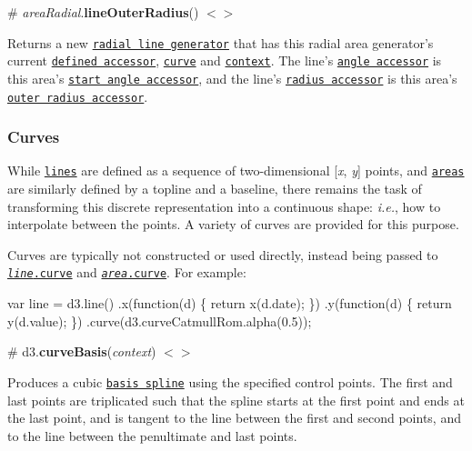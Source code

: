 \label{_areaRadial_lineOuterRadius}%
\# {\itshape area\+Radial}.{\bfseries line\+Outer\+Radius}() \href{https://github.com/d3/d3-shape/blob/master/src/areaRadial.js#L22}{\tt $<$$>$}

Returns a new \href{#lineRadial}{\tt radial line generator} that has this radial area generator’s current \href{#areaRadial_defined}{\tt defined accessor}, \href{#areaRadial_curve}{\tt curve} and \href{#areaRadial_context}{\tt context}. The line’s \href{#lineRadial_angle}{\tt angle accessor} is this area’s \href{#areaRadial_startAngle}{\tt start angle accessor}, and the line’s \href{#lineRadial_radius}{\tt radius accessor} is this area’s \href{#areaRadial_outerRadius}{\tt outer radius accessor}.

\subsubsection*{Curves}

While \href{#lines}{\tt lines} are defined as a sequence of two-\/dimensional \mbox{[}{\itshape x}, {\itshape y}\mbox{]} points, and \href{#areas}{\tt areas} are similarly defined by a topline and a baseline, there remains the task of transforming this discrete representation into a continuous shape\+: {\itshape i.\+e.}, how to interpolate between the points. A variety of curves are provided for this purpose.

Curves are typically not constructed or used directly, instead being passed to \href{#line_curve}{\tt {\itshape line}.curve} and \href{#area_curve}{\tt {\itshape area}.curve}. For example\+:


\begin{DoxyCode}
var line = d3.line()
    .x(function(d) \{ return x(d.date); \})
    .y(function(d) \{ return y(d.value); \})
    .curve(d3.curveCatmullRom.alpha(0.5));
\end{DoxyCode}


\label{_curveBasis}%
\# d3.{\bfseries curve\+Basis}({\itshape context}) \href{https://github.com/d3/d3-shape/blob/master/src/curve/basis.js#L12}{\tt $<$$>$}



Produces a cubic \href{https://en.wikipedia.org/wiki/B-spline}{\tt basis spline} using the specified control points. The first and last points are triplicated such that the spline starts at the first point and ends at the last point, and is tangent to the line between the first and second points, and to the line between the penultimate and last points.

